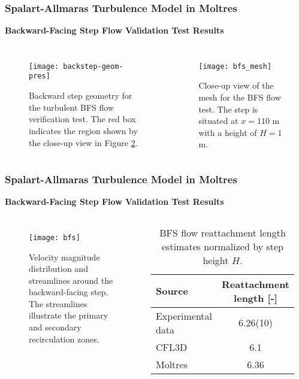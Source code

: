 \begin{frame}
  \frametitle{Spalart-Allmaras Turbulence Model in Moltres}
  \textbf{Backward-Facing Step Flow Validation Test Results}
  \begin{columns}
    \column{5.5cm}
    \begin{figure}[h]
      \centering
      \texttt{[image: backstep-geom-pres]}
      \caption{Backward step geometry for the turbulent BFS flow verification test. The red box indicates
      the region shown by the close-up view in Figure \ref{fig:bfs-mesh}.}
      \label{fig:backstep-geom}
    \end{figure}
    \column{5.5cm}
    \begin{figure}[h]
      \centering
      \texttt{[image: bfs\_mesh]}
      \caption{Close-up view of the mesh for the BFS flow test. The step is situated at $x=110$ m
      with a height of $H=1$ m.}
      \label{fig:bfs-mesh}
    \end{figure}
  \end{columns}
\end{frame}

\begin{frame}
  \frametitle{Spalart-Allmaras Turbulence Model in Moltres}
  \textbf{Backward-Facing Step Flow Validation Test Results}
  \begin{columns}
    \column{5.5cm}
    \begin{figure}[htb!]
      \centering
      \texttt{[image: bfs]}
      \caption{Velocity magnitude distribution and streamlines around the backward-facing step. The
      streamlines illustrate the primary and secondary recirculation zones.}
      \label{fig:bfs}
    \end{figure}
    \column{5.5cm}
    \begin{table}[htb]
      \centering
      \scriptsize
      \caption{BFS flow reattachment length estimates normalized by step height $H$.}
      \begin{tabular}{l S[table-format=1.2(2)]}
        \toprule
        Source & {Reattachment length [-]} \\
        \midrule
        Experimental data & 6.26(10) \\
        CFL3D & 6.1 \\
        Moltres & 6.36 \\
        \bottomrule
      \end{tabular}
      \label{table:bfs-reattach}
    \end{table}
  \end{columns}
\end{frame}

